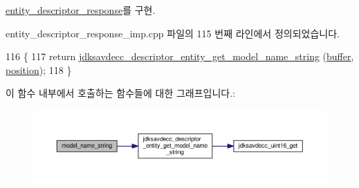 \hyperlink{classavdecc__lib_1_1entity__descriptor__response_ae7368a4664a265e6bc7e9b7a74f97f0f}{entity\+\_\+descriptor\+\_\+response}를 구현.



entity\+\_\+descriptor\+\_\+response\+\_\+imp.\+cpp 파일의 115 번째 라인에서 정의되었습니다.


\begin{DoxyCode}
116 \{
117     \textcolor{keywordflow}{return} \hyperlink{group__descriptor__entity_gadcff92a34872a1eadabfa541a0217b5e}{jdksavdecc\_descriptor\_entity\_get\_model\_name\_string}
      (\hyperlink{classavdecc__lib_1_1descriptor__response__base__imp_a56ed84df35de10bdb65e72b184309497}{buffer}, \hyperlink{classavdecc__lib_1_1descriptor__response__base__imp_a7a04afe5347934be732ec70a70bd0a28}{position});
118 \}
\end{DoxyCode}


이 함수 내부에서 호출하는 함수들에 대한 그래프입니다.\+:
\nopagebreak
\begin{figure}[H]
\begin{center}
\leavevmode
\includegraphics[width=350pt]{classavdecc__lib_1_1entity__descriptor__response__imp_aeda8c86e8d94b07005182b4dc8a32a2d_cgraph}
\end{center}
\end{figure}


